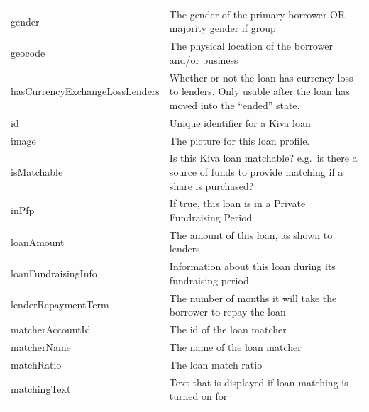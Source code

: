 \begin{longtable}{|p{}|p{}|}
    gender                               & The gender of the primary borrower OR majority gender if
    group                                                                                                    \\
    geocode                              & The physical location of the borrower and/or business             \\
    hasCurrencyExchangeLossLenders       & Whether or not the loan has currency
    loss to lenders. Only usable after the loan has moved into the ``ended''
    state.                                                                                                   \\
    id                                   & Unique identifier for a Kiva loan                                 \\
    image                                & The picture for this loan profile.                                \\
    isMatchable                          & Is this Kiva loan matchable? e.g.~is there a source of
    funds to provide matching if a share is purchased?                                                       \\
    inPfp                                & If true, this loan is in a Private Fundraising Period             \\
    loanAmount                           & The amount of this loan, as shown to lenders                      \\
    loanFundraisingInfo                  & Information about this loan during its fundraising
    period                                                                                                   \\
    lenderRepaymentTerm                  & The number of months it will take the borrower to
    repay the loan                                                                                           \\
    matcherAccountId                     & The id of the loan matcher                                        \\
    matcherName                          & The name of the loan matcher                                      \\
    matchRatio                           & The loan match ratio                                              \\
    matchingText                         & Text that is displayed if loan matching is turned on for

\end{longtable}

